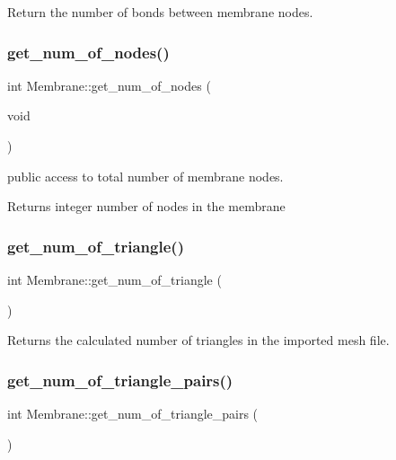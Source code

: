 Return the number of bonds between membrane nodes. \mbox{\label{classMembrane_a7ab07bf9d307d2e2b8e457a9167fff78}} 
\subsubsection{\texorpdfstring{get\_num\_of\_nodes()}{get\_num\_of\_nodes()}}
{\footnotesize\ttfamily int Membrane\+::get\+\_\+num\+\_\+of\+\_\+nodes (\begin{DoxyParamCaption}\item[{void}]{ }\end{DoxyParamCaption})\hspace{0.3cm}{\ttfamily [inline]}}



public access to total number of membrane nodes. 

\begin{DoxyReturn}{Returns}
integer number of nodes in the membrane 
\end{DoxyReturn}
\mbox{\label{classMembrane_a2ab5e9ec0ae823cfa224be4db90e11c5}} 
\subsubsection{\texorpdfstring{get\_num\_of\_triangle()}{get\_num\_of\_triangle()}}
{\footnotesize\ttfamily int Membrane\+::get\+\_\+num\+\_\+of\+\_\+triangle (\begin{DoxyParamCaption}{ }\end{DoxyParamCaption})\hspace{0.3cm}{\ttfamily [inline]}}

Returns the calculated number of triangles in the imported mesh file. \mbox{\label{classMembrane_a7aefd8327b0c02828efc321fd1ae7f07}} 
\subsubsection{\texorpdfstring{get\_num\_of\_triangle\_pairs()}{get\_num\_of\_triangle\_pairs()}}
{\footnotesize\ttfamily int Membrane\+::get\+\_\+num\+\_\+of\+\_\+triangle\+\_\+pairs (\begin{DoxyParamCaption}{ }\end{DoxyParamCaption})\hspace{0.3cm}{\ttfamily [inline]}}

